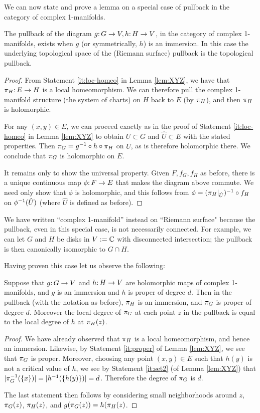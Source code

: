 We can now state and prove a lemma on a special case of pullback in the category of complex 1-manifolds. 
\begin{lemma} \label{lem:pullback}
The pullback of the diagram $g\mathpunct: G\to V, h\mathpunct: H\to V$,
in the category of complex 1-manifolds, 
exists when $g$ (or symmetrically, $h$) is an immersion. 
In this case the underlying topological space of the (Riemann surface) pullback is the topological pullback.
\end{lemma}
\begin{proof}
From Statement \eqref{it:loc-homeo} in Lemma \ref{lem:XYZ},
we have that $\pi_H\mathpunct: E\to H$ is a local homeomorphism. 
We can therefore pull the complex 1-manifold structure (the system of charts) on $H$ back to $E$ (by $\pi_H$), 
and then $\pi_H$ is holomorphic. 

For any $(x, y) \in E$, 
we can proceed exactly as in the proof of Statement \eqref{it:loc-homeo} in Lemma \ref{lem:XYZ} 
to obtain $U \subset G$ and $\hat U \subset E$ with the stated properties. 
Then $\pi_G = g^{-1} \circ h \circ \pi_H$ on $\hat U$, as is therefore holomorphic there.
We conclude that $\pi_G$ is holomorphic on $E$.

It remains only to show the universal property.
Given $F, f_G, f_H$ as before,
there is a unique continuous map $\phi\mathpunct: F \to E$ that makes the diagram above commute.
We need only show that $\phi$ is holomorphic,
and this follows from $\phi = (\pi_H|_{\hat U})^{-1} \circ f_H$ on $\phi^{-1}(\hat U)$ (where $\hat U$ is defined as before).
\end{proof}
We have written ``complex 1-manifold'' instead on ``Riemann surface" because the pullback, even in this special case, is not necessarily connected. For example, we can let $G$ and $H$ be disks in $V := {\Bbb C}$ with disconnected intersection; the pullback is then canonically isomorphic to $G \cap H$. 

Having proven this case let us observe the following:
\begin{lemma}
Suppose that $g\mathpunct: G \to V$ and $h\mathpunct: H\to V$ are holomorphic maps of complex 1-manifolds, 
and $g$ is an immersion and $h$  is proper of degree $d$.
Then in the pullback (with the notation as before), $\pi_H$ is an immersion, and $\pi_G$ is proper of degree $d$. 
Moreover the local degree of $\pi_G$ at each point $z$ in the pullback is equal to the local degree of $h$ at $\pi_H(z)$. 
\end{lemma}
\begin{proof}
We have already observed that $\pi_H$ is a local homeomorphism, and hence an immersion.
Likewise, by Statement \eqref{it:proper} of Lemma \ref{lem:XYZ}, we see that $\pi_G$ is proper. 
Moreover, choosing any point $(x, y) \in E$ such that $h(y)$ is not a critical value of $h$, 
we see by Statement \eqref{it:set2} (of Lemma \ref{lem:XYZ}) that $|\pi_G^{-1}(\{x\})| = |h^{-1}(\{ h(y) \})| = d$.
Therefore the degree of $\pi_G$ is $d$. 

The last statement then follows by considering small neighborhoods around $z$, $\pi_G(z)$, $\pi_H(z)$, and $g(\pi_G(z)) = h(\pi_H(z)$. 
\end{proof}


